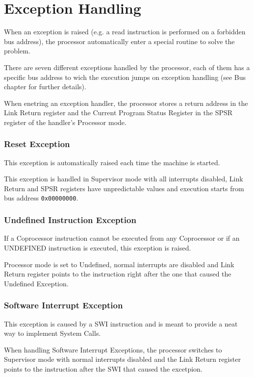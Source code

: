 

\section{Exception Handling}

When an exception is raised (e.g. a read instruction is performed on a forbidden bus address), the processor automatically enter a special routine to solve the problem. 

There are seven different exceptions handled by the processor, each of them has a specific bus address to wich the execution jumps on exception handling (see Bus chapter for further details).

When enetring an exception handler, the processor stores a return address in the Link Return register and the Current Program Status Register in the SPSR register of the handler's Processor mode.

\subsubsection{Reset Exception}
This exception is automatically raised each time the machine is started. 

This exception is handled in Supervisor mode with all interrupts disabled, Link Return and SPSR registers have unpredictable values and execution starts from bus address \texttt{0x00000000}.

\subsubsection{Undefined Instruction Exception}
If a Coprocessor instruction cannot be executed from any Coprocessor or if an UNDEFINED instruction is executed, this exception is raised. 

Processor mode is set to Undefined, normal interrupts are disabled and Link Return register points to the instruction right after the one that caused the Undefined Exception.

\subsubsection{Software Interrupt Exception}
This exception is caused by a SWI instruction and is meant to provide a neat way to implement System Calls. 

When handling Software Interrupt Exceptions, the processor switches to Supervisor mode with normal interrupts disabled and the Link Return register points to the instruction after the SWI that caused the excetpion.

